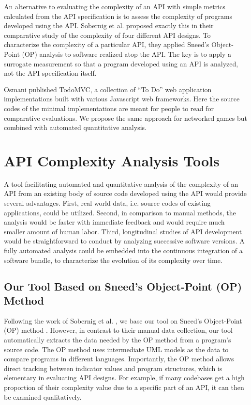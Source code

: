 \documentclass[conference]{IEEEtran}
\begin{document}
An alternative to evaluating the complexity of an API with simple
metrics calculated from the API specification is to assess the
complexity of programs developed using the API. Sobernig et
al. \cite{api-complexity-analysis} proposed exactly this in their
comparative study of the complexity of four different API designs. To
characterize the complexity of a particular API, they applied Sneed’s
\cite{Sneed} Object-Point (OP) analysis to software realized atop the
API. The key is to apply a surrogate measurement so that a program
developed using an API is analyzed, not the API specification itself.

Osmani\cite{todomvc} published TodoMVC, a collection of “To Do” web
application implementations built with various Javascript web
frameworks. Here the source codes of the minimal implementations are
meant for people to read for comparative evaluations. We propose the
same approach for networked games but combined with automated
quantitative analysis.

\section{API Complexity Analysis Tools}

A tool facilitating automated and quantitative analysis of the
complexity of an API from an existing body of source code developed
using the API would provide several advantages. First, real world
data, i.e. source codes of existing applications, could be
utilized. Second, in comparison to manual methods, the analysis would
be faster with immediate feedback and would require much smaller
amount of human labor. Third, longitudinal studies of API development
would be straightforward to conduct by analyzing successive software
versions. A fully automated analysis could be embedded into the
continuous integration of a software bundle, to characterize the
evolution of its complexity over time.

\subsection{Our Tool Based on Sneed’s Object-Point (OP) Method}

Following the work of Sobernig et al. \cite{api-complexity-analysis},
we base our tool on Sneed’s Object-Point (OP) method \cite{Sneed}.
However, in contrast to their manual data collection, our tool
automatically extracts the data needed by the OP method from a
program’s source code. The OP method uses intermediate UML models as
the data to compare programs in different languages. Importantly, the
OP method allows direct tracking between indicator values and program
structures, which is elementary in evaluating API designs. For
example, if many codebases get a high proportion of their complexity
value due to a specific part of an API, it can then be examined
qualitatively.
\end{document}
